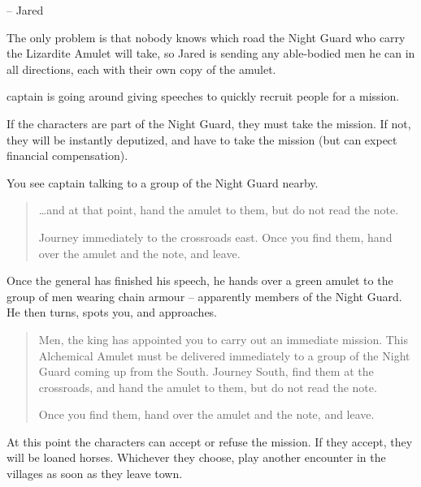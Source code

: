 \begin{multicols}{2}
\begin{boxtext}
	-- Jared

\end{boxtext}

The only problem is that nobody knows which road the Night Guard who carry the Lizardite Amulet will take, so Jared is sending any able-bodied men he can in all directions, each with their own copy of the amulet.

\Gls{captain} is going around giving speeches to quickly recruit people for a mission.

If the characters are part of the Night Guard, they must take the mission.
If not, they will be instantly deputized, and have to take the mission (but can expect financial compensation).

\begin{boxtext}

	You see \gls{captain} talking to a group of the Night Guard nearby.

	\begin{quotation}

		\ldots and at that point, hand the amulet to them, but do not read the note.

		Journey immediately to the crossroads east.
		Once you find them, hand over the amulet and the note, and leave.

	\end{quotation}

	Once the general has finished his speech, he hands over a green amulet to the group of men wearing chain armour -- apparently members of the Night Guard.
	He then turns, spots you, and approaches.

	\begin{quotation}

		Men, the king has appointed you to carry out an immediate mission.
		This Alchemical Amulet must be delivered immediately to a group of the Night Guard coming up from the South.
		Journey South, find them at the crossroads, and hand the amulet to them, but do not read the note.

		Once you find them, hand over the amulet and the note, and leave.

	\end{quotation}

\end{boxtext}

At this point the characters can accept or refuse the mission.  If they accept, they will be loaned horses.  Whichever they choose, play another encounter in the villages as soon as they leave town.


\end{multicols}
